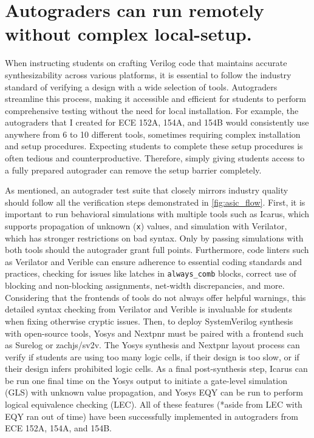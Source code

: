 \section{Autograders can run remotely without complex local-setup.}
\label{section:complex_tool_setups}

When instructing students on crafting Verilog code that maintains accurate synthesizability across various platforms, it is essential to follow the industry standard of verifying a design with a wide selection of tools. Autograders streamline this process, making it accessible and efficient for students to perform comprehensive testing without the need for local installation. For example, the autograders that I created for ECE 152A, 154A, and 154B would consistently use anywhere from 6 to 10 different tools, sometimes requiring complex installation and setup procedures. Expecting students to complete these setup procedures is often tedious and counterproductive. Therefore, simply giving students access to a fully prepared autograder can remove the setup barrier completely.

As mentioned, an autograder test suite that closely mirrors industry quality should follow all the verification steps demonstrated in \autoref{fig:asic_flow}. First, it is important to run behavioral simulations with multiple tools such as Icarus, which supports propagation of unknown (\texttt{x}) values, and simulation with Verilator, which has stronger restrictions on bad syntax. Only by passing simulations with both tools should the autograder grant full points. Furthermore, code linters such as Verilator and Verible can ensure adherence to essential coding standards and practices, checking for issues like latches in \texttt{always_comb} blocks, correct use of blocking and non-blocking assignments, net-width discrepancies, and more. Considering that the frontends of tools do not always offer helpful warnings, this detailed syntax checking from Verilator and Verible is invaluable for students when fixing otherwise cryptic issues. Then, to deploy SystemVerilog synthesis with open-source tools, Yosys and Nextpnr must be paired with a frontend such as Surelog or zachjs/sv2v. The Yosys synthesis and Nextpnr layout process can verify if students are using too many logic cells, if their design is too slow, or if their design infers prohibited logic cells. As a final post-synthesis step, Icarus can be run one final time on the Yosys output to initiate a gate-level simulation (GLS) with unknown value propagation, and Yosys EQY can be run to perform logical equivalence checking (LEC). All of these features (*aside from LEC with EQY {ran out of time}) have been successfully implemented in autograders from ECE 152A, 154A, and 154B.

